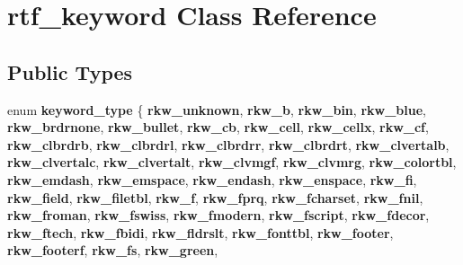 \hypertarget{classrtf__keyword}{}\section{rtf\+\_\+keyword Class Reference}
\label{classrtf__keyword}
\subsection*{Public Types}
\begin{DoxyCompactItemize}
\item 
\mbox{\label{classrtf__keyword_ac64b6c704ba0ecc4e2bf4417fe6a58f4}} 
enum {\bfseries keyword\+\_\+type} \{ \newline
{\bfseries rkw\+\_\+unknown}, 
{\bfseries rkw\+\_\+b}, 
{\bfseries rkw\+\_\+bin}, 
{\bfseries rkw\+\_\+blue}, 
\newline
{\bfseries rkw\+\_\+brdrnone}, 
{\bfseries rkw\+\_\+bullet}, 
{\bfseries rkw\+\_\+cb}, 
{\bfseries rkw\+\_\+cell}, 
\newline
{\bfseries rkw\+\_\+cellx}, 
{\bfseries rkw\+\_\+cf}, 
{\bfseries rkw\+\_\+clbrdrb}, 
{\bfseries rkw\+\_\+clbrdrl}, 
\newline
{\bfseries rkw\+\_\+clbrdrr}, 
{\bfseries rkw\+\_\+clbrdrt}, 
{\bfseries rkw\+\_\+clvertalb}, 
{\bfseries rkw\+\_\+clvertalc}, 
\newline
{\bfseries rkw\+\_\+clvertalt}, 
{\bfseries rkw\+\_\+clvmgf}, 
{\bfseries rkw\+\_\+clvmrg}, 
{\bfseries rkw\+\_\+colortbl}, 
\newline
{\bfseries rkw\+\_\+emdash}, 
{\bfseries rkw\+\_\+emspace}, 
{\bfseries rkw\+\_\+endash}, 
{\bfseries rkw\+\_\+enspace}, 
\newline
{\bfseries rkw\+\_\+fi}, 
{\bfseries rkw\+\_\+field}, 
{\bfseries rkw\+\_\+filetbl}, 
{\bfseries rkw\+\_\+f}, 
\newline
{\bfseries rkw\+\_\+fprq}, 
{\bfseries rkw\+\_\+fcharset}, 
{\bfseries rkw\+\_\+fnil}, 
{\bfseries rkw\+\_\+froman}, 
\newline
{\bfseries rkw\+\_\+fswiss}, 
{\bfseries rkw\+\_\+fmodern}, 
{\bfseries rkw\+\_\+fscript}, 
{\bfseries rkw\+\_\+fdecor}, 
\newline
{\bfseries rkw\+\_\+ftech}, 
{\bfseries rkw\+\_\+fbidi}, 
{\bfseries rkw\+\_\+fldrslt}, 
{\bfseries rkw\+\_\+fonttbl}, 
\newline
{\bfseries rkw\+\_\+footer}, 
{\bfseries rkw\+\_\+footerf}, 
{\bfseries rkw\+\_\+fs}, 
{\bfseries rkw\+\_\+green}, 

\end{DoxyCompactItemize}
